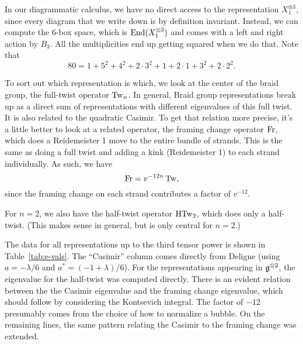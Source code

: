 \documentclass[12pt]{amsart}
\begin{document}
In our diagrammatic calculus, we have no direct access to the
representation $X_1^{\otimes 3}$, since every diagram that we write
down is by definition invariant. Instead, we can compute the 6-box
space, which is $\operatorname{End}(X_1^{\otimes 3})$ and comes with a left and
right action by $B_3$. All the multiplicities end up getting squared
when we do that. Note that
\[
80 = 1 + 5^2 + 4^2 + 2\cdot 3^2 + 1 + 2\cdot 1 + 3^2 + 2\cdot 2^2.
\]

To sort out which representation is which, we look at the center of
the braid group, the full-twist operator $\operatorname{Tw}_n$. In general, Braid
group representations break up as a direct sum of representations with
different eigenvalues of this full twist. It is also related to the
quadratic Casimir. To get that relation more precise, it's a little
better to look at a related operator, the framing change operator
$\operatorname{Fr}$, which does a Reidemeister 1 move to the entire bundle of
strands. This is the same as doing a full twist and adding a kink
(Reidemeister 1) to each strand individually. As such, we have
\[
\operatorname{Fr} = v^{-12n} \operatorname{Tw},
\]
since the framing change on each strand contributes a factor of
$v^{-12}$.

For $n=2$, we also have the half-twist operator $\operatorname{HTw}_2$, which does
only a half-twist. (This makes sense in general, but is only central
for $n=2$.)

The data for all representations up to the third tensor power is shown
in Table~\ref{tab:e-vals}. The ``Casimir'' column comes directly from
Deligne (using $a = -\lambda/6$ and $a^* = (-1+\lambda)/6$). For the
representations appearing in ${\mathfrak g}^{\otimes 2}$, the eigenvalue for the
half-twist was computed directly. There is an evident relation between
the the Casimir eigenvalue and the framing change eigenvalue, which
should follow by considering the Kontsevich integral. The factor of
$-12$ presumably comes from the choice of how to normalize a
bubble. On the remaining lines, the same pattern relating the Casimir
to the framing change was extended.
\end{document}
